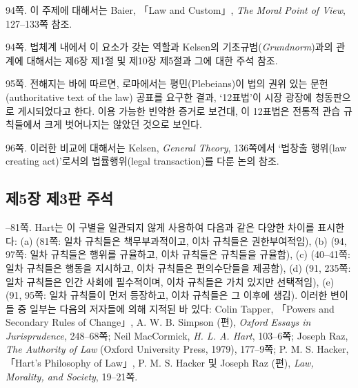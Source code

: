 {\noteentry 94쪽.  이 주제에 대해서는 Baier, 「Law and
Custom」, \emph{The Moral Point of View}, 127--133쪽 참조.

\noteentry 94쪽.  법체계 내에서 이 요소가
갖는 역할과 Kelsen의 기초규범(\emph{Grundnorm})과의 관계에 대해서는
제6장 제1절 및 제10장 제5절과 그에 대한 주석 참조.

\noteentry 95쪽.  전해지는 바에 따르면, 로마에서는 평민(Plebeians)이 법의 권위 있는
문헌(authoritative text of the law) 공표를 요구한 결과, ‘12표법’이 시장
광장에 청동판으로 게시되었다고 한다. 이용 가능한 빈약한 증거로 보건대,
이 12표법은 전통적 관습 규칙들에서 크게 벗어나지는 않았던 것으로 보인다.

\noteentry 96쪽.  이러한 비교에
대해서는 Kelsen, \emph{General Theory}, 136쪽에서 ‘법창출 행위(law
creating act)’로서의 법률행위(legal transaction)를 다룬 논의 참조.

\subsection{제5장 제3판
주석}\label{uxc81c5uxc7a5-uxc81c3uxd310-uxc8fcuxc11d}

--81쪽.  Hart는 이 구별을 일관되지 않게 사용하여 다음과 같은 다양한
차이를 표시한다: (a)  (81쪽: 일차 규칙들은
책무부과적이고, 이차 규칙들은 권한부여적임), (b)  (94, 97쪽:
일차 규칙들은 행위를 규율하고, 이차 규칙들은 규칙들을 규율함), (c)
 (40--41쪽: 일차 규칙들은 행동을 지시하고, 이차
규칙들은 편의수단들을 제공함), (d)  (91, 235쪽: 일차
규칙들은 인간 사회에 필수적이며, 이차 규칙들은 가치 있지만 선택적임),
(e)  (91, 95쪽: 일차 규칙들이 먼저 등장하고, 이차 규칙들은 그
이후에 생김). 이러한 변이들 중 일부는 다음의 저자들에 의해 지적된 바
있다: Colin Tapper, 「Powers and Secondary Rules of Change」, A. W. B.
Simpson (편), \emph{Oxford Essays in Jurisprudence}, 248--68쪽; Neil
MacCormick, \emph{H. L. A. Hart}, 103--6쪽; Joseph Raz, \emph{The
Authority of Law} (Oxford University Press, 1979), 177--9쪽; P. M. S.
Hacker, 「Hart's Philosophy of Law」, P. M. S. Hacker 및 Joseph Raz
(편), \emph{Law, Morality, and Society}, 19--21쪽.

}
